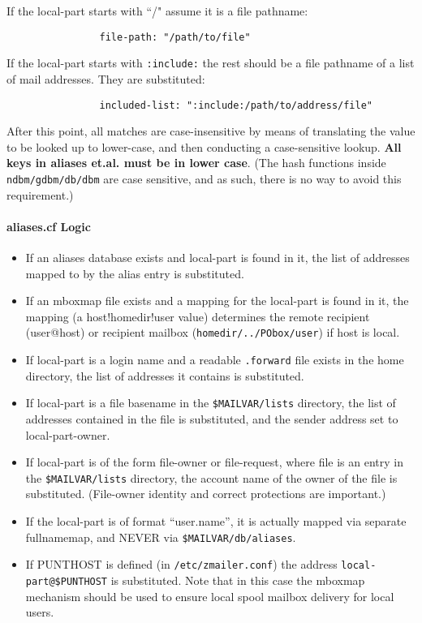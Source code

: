 If the local-part starts with ``/" assume it is a file pathname:
\begin{tscreen}
\begin{verbatim}
                file-path: "/path/to/file"
\end{verbatim}
\end{tscreen}

If the local-part starts with {\tt :include:} the rest should be a file
pathname of a list of mail addresses.  They are substituted:
\begin{tscreen}
\begin{verbatim}
                included-list: ":include:/path/to/address/file"
\end{verbatim}
\end{tscreen}

After this point, all matches are case-insensitive by means of translating
the value to be looked up to lower-case, and then conducting a case-sensitive
lookup. {\bf All keys in aliases et.al. must be in lower case}.
(The hash functions inside  {\tt ndbm/gdbm/db/dbm}  are case sensitive, and 
as such, there is no way to avoid this requirement.)




\paragraph{aliases.cf Logic}



\begin{itemize}
\item If an aliases database exists and local-part is found in it, the list of
addresses mapped to by the alias entry is substituted.
\item If an mboxmap file exists and a mapping for the local-part is found in it,
the mapping (a host!homedir!user value) determines the remote recipient
(user@host) or recipient mailbox ({\tt homedir/../PObox/user}) if host 
is local.
\item If local-part is a login name and a readable {\tt .forward} file 
exists in the home directory, the list of addresses it contains is substituted.
\item If local-part is a file basename in the {\tt \$MAILVAR/lists} 
directory, the   list of addresses contained in the file is substituted, and 
the sender address set to local-part-owner.
\item If local-part is of the form file-owner or file-request, where file is
an entry in the {\tt \$MAILVAR/lists} directory, the account name 
of the owner of the file is substituted.   (File-owner identity and correct 
protections are important.)
\item If the local-part is of format  ``user.name'',  it is actually mapped via
separate   fullnamemap, and NEVER via {\tt \$MAILVAR/db/aliases}.
\item If PUNTHOST is defined (in {\tt /etc/zmailer.conf}) the address
{\tt local-part@\$PUNTHOST} is substituted.  Note that in this case
the mboxmap mechanism should be used to ensure local spool
mailbox delivery for local users.
\end{itemize}





